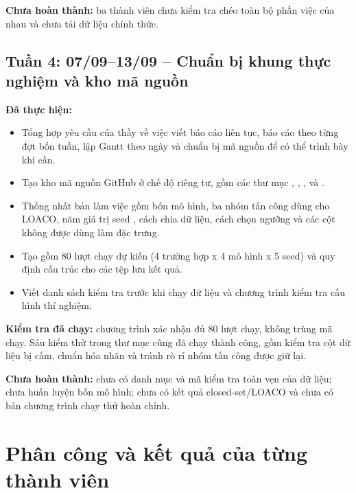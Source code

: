 \documentclass[12pt,a4paper,oneside]{article}
\begin{document}
\textbf{Chưa hoàn thành:} ba thành viên chưa kiểm tra chéo toàn bộ phần việc của nhau và chưa tải dữ liệu chính thức.

\subsection{Tuần 4: 07/09--13/09 -- Chuẩn bị khung thực nghiệm và kho mã nguồn}
\textbf{Đã thực hiện:}
\begin{itemize}[leftmargin=1.05cm,itemsep=0.2em]
\item Tổng hợp yêu cầu của thầy về việc viết báo cáo liên tục, báo cáo theo từng đợt bốn tuần, lập Gantt theo ngày và chuẩn bị mã nguồn để có thể trình bày khi cần.
\item Tạo kho mã nguồn GitHub ở chế độ riêng tư, gồm các thư mục , , ,  và .
\item Thống nhất bản làm việc gồm bốn mô hình, ba nhóm tấn công dùng cho LOACO, năm giá trị seed , cách chia dữ liệu, cách chọn ngưỡng và các cột không được dùng làm đặc trưng.
\item Tạo  gồm 80 lượt chạy dự kiến (4 trường hợp x 4 mô hình x 5 seed) và quy định cấu trúc cho các tệp lưu kết quả.
\item Viết danh sách kiểm tra trước khi chạy dữ liệu và chương trình kiểm tra cấu hình thí nghiệm.
\end{itemize}

\textbf{Kiểm tra đã chạy:} chương trình  xác nhận đủ 80 lượt chạy, không trùng mã chạy. Sáu kiểm thử trong thư mục  cũng đã chạy thành công, gồm kiểm tra cột dữ liệu bị cấm, chuẩn hóa nhãn và tránh rò rỉ nhóm tấn công được giữ lại.

\textbf{Chưa hoàn thành:} chưa có danh mục và mã kiểm tra toàn vẹn của dữ liệu; chưa huấn luyện bốn mô hình; chưa có kết quả closed-set/LOACO và chưa có bản chương trình chạy thử hoàn chỉnh.

\section{Phân công và kết quả của từng thành viên}
\end{document}
